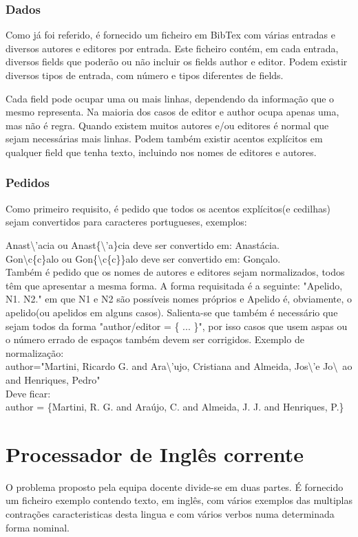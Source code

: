 \documentclass{report}
\begin{document}
\subsubsection{Dados}
Como já foi referido, é fornecido um ficheiro em BibTex com várias entradas e diversos autores e editores por entrada. Este ficheiro contém, em cada entrada, diversos fields que poderão ou não incluir os fields author e editor. Podem existir
diversos tipos de entrada, com número e tipos diferentes de fields.\par
Cada field pode ocupar uma ou mais linhas, dependendo da informação que o mesmo representa. Na maioria dos casos de editor
e author ocupa apenas uma, mas não é regra. Quando existem muitos autores e/ou editores é normal que sejam
necessárias mais linhas. Podem também existir acentos explícitos em qualquer field que tenha texto, incluindo nos nomes
de editores e autores.
\subsubsection{Pedidos}
Como primeiro requisito, é pedido que todos os acentos explícitos(e cedilhas) sejam convertidos para caracteres portugueses,
 exemplos:\par
Anast\textbackslash'acia ou Anast\{\textbackslash'a\}cia deve ser convertido em: Anastácia. \\
Gon\textbackslash c\{c\}alo ou Gon\{\textbackslash c\{c\}\}alo deve ser convertido em: Gonçalo. \\
Também é pedido que os nomes de autores e editores sejam normalizados, todos têm que apresentar a mesma forma.
A forma requisitada é a seguinte: "Apelido, N1. N2." em que N1 e N2 são possíveis nomes próprios e Apelido é,
obviamente, o apelido(ou apelidos em alguns casos). Salienta-se que também é necessário que sejam todos da forma
"author/editor = \{ ... \}", por isso casos que usem aspas ou o número errado de espaços também devem ser 
corrigidos. Exemplo de normalização: \\
author="Martini, Ricardo G. and Ara{\textbackslash’u}jo, Cristiana and Almeida, 
Jos{\textbackslash’e} Jo{\textbackslash~a}o and Henriques, Pedro" \\
Deve ficar: \\
author = \{Martini, R. G. and Araújo, C. and Almeida, J. J. and Henriques, P.\}


\section{Processador de Inglês corrente}
O problema proposto pela equipa docente divide-se em duas partes. É fornecido um ficheiro exemplo contendo texto, em inglês, com vários exemplos das multiplas contrações caracteristicas desta lingua e com vários verbos numa determinada forma nominal. 
\end{document}
